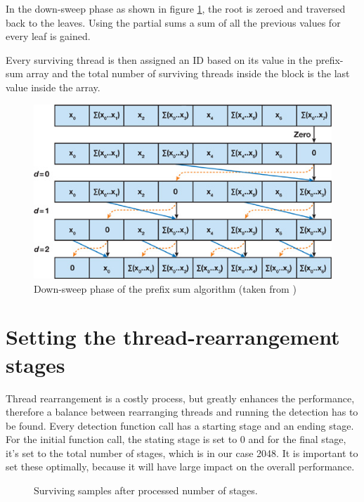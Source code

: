 In the down-sweep phase as shown in figure \ref{fig:sweepdown}, the root is zeroed and traversed back to the leaves. Using the partial sums a sum of all the previous values for every leaf is gained.

Every surviving thread is then assigned an ID based on its value in the prefix-sum array and the total number of surviving threads inside the block is the last value inside the array.

\begin{center}
\begin{figure}[ht]
	\centering\includegraphics[width=0.6\linewidth]{fig/sweepdown.jpg}
	\caption{Down-sweep phase of the prefix sum algorithm (taken from \cite{harris2007parallel})}
	\label{fig:sweepdown}
\end{figure}
\end{center}

\section{Setting the thread-rearrangement stages}

Thread rearrangement is a costly process, but greatly enhances the performance, therefore a balance between rearranging threads and running the detection has to be found. Every detection function call has a starting stage and an ending stage. For the initial function call, the stating stage is set to 0 and for the final stage, it's set to the total number of stages, which is in our case 2048. It is important to set these optimally, because it will have large impact on the overall performance.

\begin{figure}[ht]
\centering{}
	\caption{Surviving samples after processed number of stages.}
	\label{fig:survivor-count}
\end{figure}

